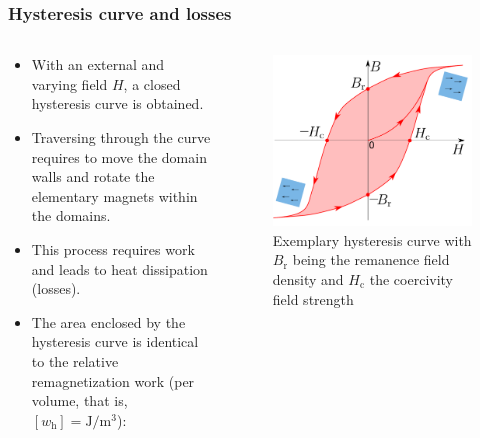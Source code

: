 \begin{frame}
	\frametitle{Hysteresis curve and losses}
	\begin{columns}
		\begin{column}{0.5\textwidth}
            \begin{itemize}
                \item With an external and varying field $H$, a closed hysteresis curve is obtained.
                \item<2-> Traversing through the curve requires to move the domain walls and rotate the elementary magnets within the domains.
                \item<3-> This process requires work and leads to heat dissipation (losses).
                \item<4-> The area enclosed by the hysteresis curve is identical to the relative remagnetization work (per volume, that is, $[w_{\mathrm{h}}]=\si{\joule\per\metre\cubed}$):
            \end{itemize}
		\end{column}
        \hfill
		\begin{column}{0.475\textwidth}
            \vspace{-0.2cm}
			\begin{figure}
				\centering
				\includegraphics[height=0.55\textheight]{fig/lec02/Hyteresis_curve_full.pdf}
				\caption{Exemplary hysteresis curve with $B_\mathrm{r}$ being the remanence field density and $H_\mathrm{c}$ the coercivity field strength}
                \label{fig:Hyteresis_curve_full}
			\end{figure}
		\end{column}
		\end{columns}
\end{frame}

